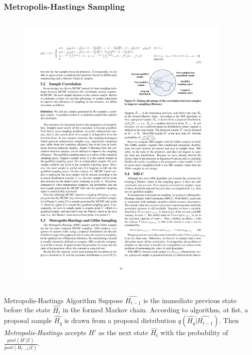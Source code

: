 
\begin{frame}
\frametitle{Metropolis-Hastings Sampling}

\begin{columns}[c]

\begin{figure}[tb]
  \includegraphics[width=\columnwidth]{figures/3-1/3-1-10.pdf}
\end{figure}

\begin{example}
\end{example}

\end{columns}

\begin{block}{Metropolis-Hastings Algorithm}
Suppose $\hat{H_{t-1}}$ is the immediate previous state before the state $\hat{H_t}$ in the formed Markov chain. According to  algorithm, at fist, a proposal sample $\hat{H_q}$ is drawn from a proposal distribution $q(\hat{H_q}|\hat{H_{t-1}})$. Then \emph{Metropolis-Hastings} accepts $H'$ as the next state $\hat{H_t}$ with the probability of $\frac{post(H'|\mathbb{Z})}{post(H_{t-1}|\mathbb{Z})}$.
\end{block}


\end{frame}

